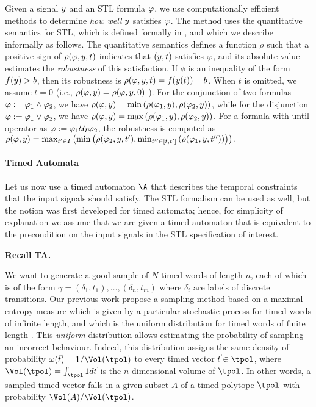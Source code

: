 Given a signal $y$ and an STL formula $\varphi$, we use computationally efficient methods to determine \emph{how well} $y$ satisfies $\varphi$.
The method uses the quantitative semantics for STL, which 
is defined formally in \cite{DonzeM10}, and which we describe informally as follows. The
quantitative semantics defines a function $\rho$ such that a positive sign of
$\rho(\varphi,y,t)$ indicates that $(y,t)$ satisfies
$\varphi$, and its absolute value estimates the \emph{robustness} of
this satisfaction. If $\phi$ is an inequality of the form
$f(y)>b$, then its robustness is $\rho(\varphi,y,t) = f(y(t))-b$.  
When $t$ is omitted, we assume $t=0$ (i.e., $\rho(\varphi,y)=\rho(\varphi,y,0)$ ).
For the conjunction of two
formulas $\varphi := \varphi_1 \wedge \varphi_2$, we have
$\rho(\varphi,y)=\min \left( \rho(\varphi_1,y),\rho(\varphi_2,y)\right)$,
while for the disjunction $\varphi := \varphi_1 \vee \varphi_2$, we have
$\rho(\varphi,y)=\max\left(\rho(\varphi_1,y),\rho(\varphi_2,y)\right)$.
For a formula with until operator as $\varphi := \varphi_1 \mathcal{U}_I \varphi_2$,
the robustness is computed as $\rho(\varphi,y) = \max_{t^\prime\in
  I}\left(\min\left(\rho(\varphi_2,y,t^\prime),\min_{t^{\prime\prime}\in
  [t,t^\prime]}\left(\rho(\varphi_1,y,t^{\prime\prime})\right)\right)\right).$


\paragraph{Timed Automata}
Let us now use a timed automaton $\A$ that describes the temporal constraints that the input signals should satisfy. The STL formalism can be used as well, but the notion was first developed for timed automata; hence, for simplicity of explanation we assume that we are given a timed automaton that is equivalent to the precondition on the input signals in the STL specification of interest. 

{\bf Recall TA.}


We want to generate a good sample of $N$ timed words of length $n$, each of which is of the form $\gamma = (\delta_1, t_1), \ldots, (\delta_n, t_m)$ where $\delta_i$ are labels of discrete transitions. Our previous work \cite{maxent,BBBK16} propose a sampling method based on a maximal entropy measure which is given by a particular stochastic process \cite{maxent} for timed words of infinite length, and which is the uniform distribution for timed words of finite length \cite{BBBK16}. This \emph{uniform} distribution allows estimating the probability of sampling an incorrect behaviour. Indeed, this distribution assigns the same density of probability $\omega(\vec t) = 1/\Vol(\tpol)$ to every timed vector $\vec t\in\tpol$, where $\Vol(\tpol)=\int_{\tpol} 1 d\vec t$ is the $n$-dimensional volume of $\tpol$. In other words, a sampled timed vector falls in a given subset $A$ of a timed polytope $\tpol$ with probability $\Vol(A)/\Vol(\tpol)$. 

